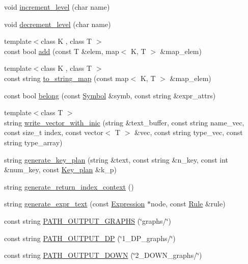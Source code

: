 \begin{CompactItemize}
\item 
void \hyperlink{namespacegenevalmag_0cd76ff96d0edddb2332eb74a4085ab5}{increment\_\-level} (char name)
\item 
void \hyperlink{namespacegenevalmag_c34c135063b809b19dafd05aa81297c8}{decrement\_\-level} (char name)
\item 
{\footnotesize template$<$class K , class T $>$ }\\const bool \hyperlink{namespacegenevalmag_95d75ecfcb4371b57086093c66a96bd4}{add} (const T \&elem, map$<$ K, T $>$ \&map\_\-elem)
\item 
{\footnotesize template$<$class K , class T $>$ }\\const string \hyperlink{namespacegenevalmag_bdfa348edf2ec215b8dce63ebeab02e9}{to\_\-string\_\-map} (const map$<$ K, T $>$ \&map\_\-elem)
\item 
const bool \hyperlink{namespacegenevalmag_9cb36d1a43794afa2b45c729c6c87170}{belong} (const \hyperlink{classgenevalmag_1_1Symbol}{Symbol} \&symb, const string \&expr\_\-attrs)
\item 
{\footnotesize template$<$class T $>$ }\\string \hyperlink{namespacegenevalmag_f74af87309332e02ec5d55c14ab1fa97}{write\_\-vector\_\-with\_\-inic} (string \&text\_\-buffer, const string name\_\-vec, const size\_\-t index, const vector$<$ T $>$ \&vec, const string type\_\-vec, const string type\_\-array)
\item 
string \hyperlink{namespacegenevalmag_c58f50a004a774ce4256b86a16fb96c0}{generate\_\-key\_\-plan} (string \&text, const string \&n\_\-key, const int \&num\_\-key, const \hyperlink{structgenevalmag_1_1k__plan}{Key\_\-plan} \&k\_\-p)
\item 
string \hyperlink{namespacegenevalmag_d027bb2060fc75b17da08a22c9be3b9a}{generate\_\-return\_\-index\_\-context} ()
\item 
string \hyperlink{namespacegenevalmag_5935695d2ab4f63ea670911809399ce0}{generate\_\-expr\_\-text} (const \hyperlink{classgenevalmag_1_1Expression}{Expression} $\ast$node, const \hyperlink{classgenevalmag_1_1Rule}{Rule} \&rule)
\item 
const string \hyperlink{namespacegenevalmag_306e982e69207c606c1d6f236259b4e1}{PATH\_\-OUTPUT\_\-GRAPHS} (\char`\"{}graphs/\char`\"{})
\item 
const string \hyperlink{namespacegenevalmag_6d797bb23dc6e170ede7178c9ddb3f08}{PATH\_\-OUTPUT\_\-DP} (\char`\"{}1\_\-DP\_\-graphs/\char`\"{})
\item 
const string \hyperlink{namespacegenevalmag_fce5456f0ffc52ff62202b4c185d453c}{PATH\_\-OUTPUT\_\-DOWN} (\char`\"{}2\_\-DOWN\_\-graphs/\char`\"{})

\end{CompactItemize}
